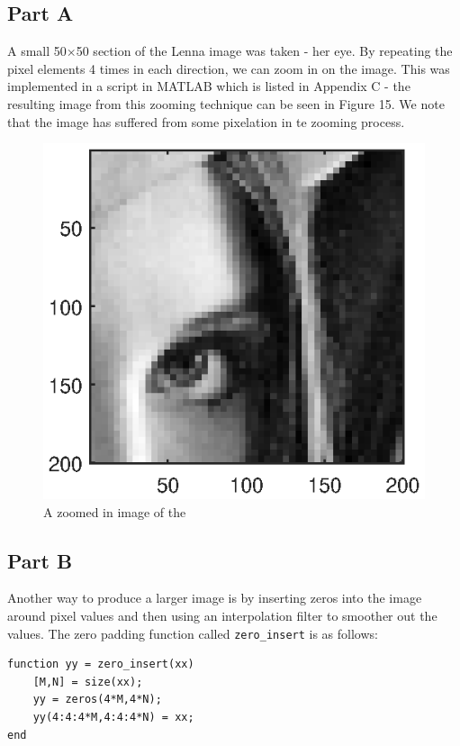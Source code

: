 \documentclass{article}
\begin{document}
\subsection{Part A}
A small 50$\times$50 section of the Lenna image was taken - her eye. By repeating the pixel elements 4 times in each direction, we can zoom in on the image. This was implemented in a script in MATLAB which is listed in Appendix C - the resulting image from this zooming technique can be seen in Figure 15. We note that the image has suffered from some pixelation in te zooming process.
\begin{figure}[H]
	\centering
	\includegraphics[scale=1]{fig15}
	\caption{A zoomed in image of the }
\end{figure} 

\subsection{Part B}
Another way to produce a larger image is by inserting zeros into the image around pixel values and then using an interpolation filter to smoother out the values. The zero padding function called \verb|zero_insert| is as follows:
\begin{lstlisting}
function yy = zero_insert(xx)
	[M,N] = size(xx);
	yy = zeros(4*M,4*N);
	yy(4:4:4*M,4:4:4*N) = xx;
end
\end{lstlisting}
\end{document}
